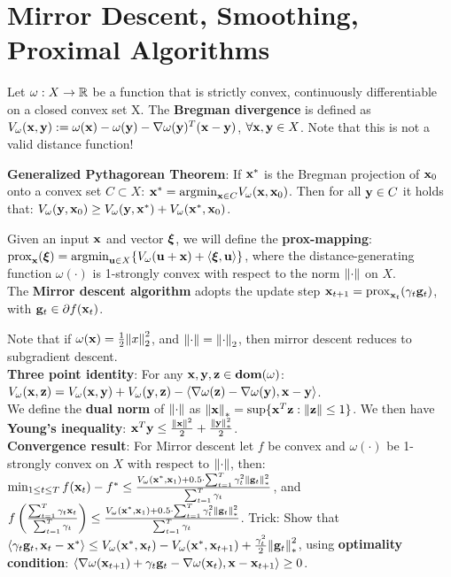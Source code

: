 \section{Mirror Descent, Smoothing, Proximal Algorithms}
\begin{framed}
    Let $\omega : X \rightarrow \mathbb{R}$ be a function that is strictly convex, continuously differentiable on a closed convex set X. The \textbf{Bregman divergence} is defined as $V_{\omega}(\mathbf{x}, \mathbf{y}) := \omega(\mathbf{x}) - \omega(\mathbf{y}) - \nabla \omega(\mathbf{y})^T (\mathbf{x} - \mathbf{y})$, $\forall \mathbf{x}, \mathbf{y} \in X$. Note that this is not a valid distance function!
\end{framed}
\textbf{Generalized Pythagorean Theorem}: If $\mathbf{x}^*$ is the Bregman projection of $\mathbf{x}_0$ onto a convex set $C \subset X$: $\mathbf{x}^* = \mathrm{argmin}_{\mathbf{x} \in C}{V_{\omega}(\mathbf{x}, \mathbf{x}_0)}$. Then for all $\mathbf{y} \in C$ it holds that: $V_{\omega}(\mathbf{y}, \mathbf{x}_0) \geq V_{\omega}(\mathbf{y}, \mathbf{x}^*) + V_{\omega}(\mathbf{x}^*, \mathbf{x}_0)$. \\
\begin{framed}
    Given an input $\mathbf{x}$ and vector $\boldsymbol{\xi}$, we will define the \textbf{prox-mapping}: $\mathrm{prox}_{\mathbf{x}}(\boldsymbol{\xi}) = \mathrm{argmin}_{\mathbf{u} \in X}\{V_{\omega}(\mathbf{u} + \mathbf{x}) + \langle \boldsymbol{\xi}, \mathbf{u} \rangle \}$, where the distance-generating function $\omega(\cdot)$ is 1-strongly convex with respect to the norm $\norm{\cdot}$ on $X$. \\
    The \textbf{Mirror descent algorithm} adopts the update step $\mathbf{x}_{t+1} = \mathrm{prox}_{\mathbf{x}_t}(\gamma_t \mathbf{g}_t)$, with $\mathbf{g}_t \in \partial f(\mathbf{x}_t)$.
\end{framed}
Note that if $\omega(\mathbf{x}) = \frac{1}{2}\norm{x}_2^2$, and $\norm{\cdot} = \norm{\cdot}_2$, then mirror descent reduces to subgradient descent. \\
\textbf{Three point identity}: For any $\mathbf{x}, \mathbf{y}, \mathbf{z} \in \textbf{dom}(\omega)$: $V_{\omega}(\mathbf{x}, \mathbf{z}) = V_{\omega}(\mathbf{x}, \mathbf{y}) + V_{\omega}(\mathbf{y}, \mathbf{z}) - \langle \nabla \omega(\mathbf{z}) - \nabla \omega(\mathbf{y}), \mathbf{x} - \mathbf{y} \rangle$. \\
We define the \textbf{dual norm} of $\norm{\cdot}$ as $\norm{\mathbf{x}}_* = \sup \{ \mathbf{x}^T \mathbf{z} : \norm{\mathbf{z}} \leq 1\}$. We then have \textbf{Young's inequality}: $\mathbf{x}^T \mathbf{y} \leq \frac{\norm{\mathbf{x}}^2}{2} + \frac{\norm{\mathbf{y}}_*^2}{2}$. \\
\textbf{Convergence result}: For Mirror descent let $f$ be convex and $\omega(\cdot)$ be 1-strongly convex on $X$ with respect to $\norm{\cdot}$, then: $\min_{1 \leq t \leq T}{f(\mathbf{x}_t) - f^*} \leq \frac{V_{\omega}(\mathbf{x}^*, \mathbf{x}_1) + 0.5 \cdot \sum_{t=1}^T{\gamma_t^2 \norm{\mathbf{g}_t}_*^2}}{\sum_{t=1}^T{\gamma_t}}$, and $ f\left( \frac{\sum_{t=1}^T{\gamma_t \mathbf{x}_t}}{\sum_{t=1}^T{\gamma_t}}\right)\leq \frac{V_{\omega}(\mathbf{x}^*, \mathbf{x}_1) + 0.5 \cdot \sum_{t=1}^T{\gamma_t^2 \norm{\mathbf{g}_t}_*^2}}{\sum_{t=1}^T{\gamma_t}}$. Trick: Show that $\langle \gamma_t \mathbf{g}_t, \mathbf{x}_t - \mathbf{x}^* \rangle \leq V_{\omega}(\mathbf{x}^*, \mathbf{x}_t) - V_{\omega}(\mathbf{x}^*, \mathbf{x}_{t+1}) + \frac{\gamma_t^2}{2} \norm{\mathbf{g}_t}_*^2$, using \textbf{optimality condition}: $\langle \nabla \omega(\mathbf{x}_{t+1}) + \gamma_t \mathbf{g}_t - \nabla \omega(\mathbf{x}_t), \mathbf{x} - \mathbf{x}_{t+1} \rangle \geq 0$. \\
